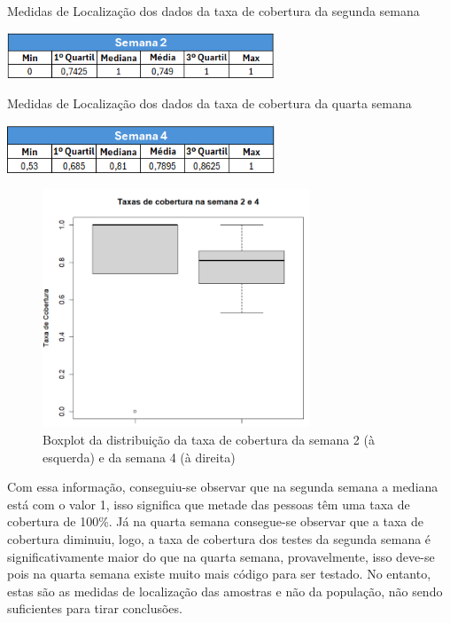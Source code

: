 \documentclass[%
 aip,
cp,  %
 amsmath,amssymb,%
 reprint,%
]{revtex4-2}
\begin{document}
\begin{table}[!h]
    \centering
    \caption{Medidas de Localização dos dados da taxa de cobertura da segunda semana}
    \includegraphics[width=8cm]{imagens/questao1/tabelaSummarySemana2.png}
    \label{Summary_Semana2}
\end{table}

\begin{table}[!h]
    \centering
    \caption{Medidas de Localização dos dados da taxa de cobertura da quarta semana}
    \includegraphics[width=8cm]{imagens/questao1/tabelaSummarySemana4.png}
    \label{Summary_Semana4}
\end{table}

\begin{figure}[!h]
    \centering
    \includegraphics[width=8cm]{imagens/questao1/Boxplot_Semana2_4.png}
    \caption{Boxplot da distribuição da taxa de cobertura da semana 2 (à esquerda) e da semana 4 (à direita)}
    \label{Boxplot_Semana2_4}
\end{figure}

Com essa informação, conseguiu-se observar que na segunda semana a mediana está com o valor 1, isso significa que metade das pessoas têm uma taxa de cobertura de 100\%. Já na quarta semana consegue-se observar que a taxa de cobertura diminuiu, logo, a taxa de cobertura dos testes da segunda semana é significativamente maior do que na quarta semana, provavelmente, isso deve-se pois na quarta semana existe muito mais código para ser testado. No entanto, estas são as medidas de localização das amostras e não da população, não sendo suficientes para tirar conclusões.
\end{document}
